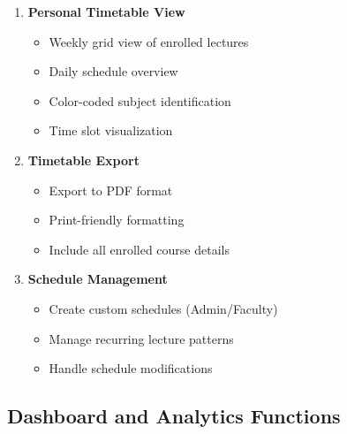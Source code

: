 \begin{enumerate}[leftmargin=*]
    \item \textbf{Personal Timetable View}
    \begin{itemize}
        \item Weekly grid view of enrolled lectures
        \item Daily schedule overview
        \item Color-coded subject identification
        \item Time slot visualization
    \end{itemize}
    
    \item \textbf{Timetable Export}
    \begin{itemize}
        \item Export to PDF format
        \item Print-friendly formatting
        \item Include all enrolled course details
    \end{itemize}
    
    \item \textbf{Schedule Management}
    \begin{itemize}
        \item Create custom schedules (Admin/Faculty)
        \item Manage recurring lecture patterns
        \item Handle schedule modifications
    \end{itemize}
\end{enumerate}

\subsection{Dashboard and Analytics Functions}

